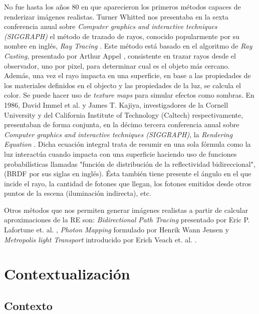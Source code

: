 \documentclass[titlepage,12pt]{report}
\begin{document}
No fue hasta los años 80 en que aparecieron los primeros métodos capaces de renderizar imágenes realistas. Turner Whitted nos presentaba en la sexta conferencia anual sobre \textit{Computer graphics and interactive techniques (SIGGRAPH)} el método de trazado de rayos, conocido popularmente por su nombre en inglés, \textit{Ray Tracing} \cite{Whitted1980}. Este método está basado en el algoritmo de \textit{Ray Casting}, presentado por Arthur Appel \cite{Appel1968}, consistente en trazar rayos desde el observador, uno por pixel, para determinar cual es el objeto más cercano. Además, una vez el rayo impacta en una superficie, en base a las propiedades de los materiales definidos en el objecto y las propiedades de la luz, se calcula el color. Se puede hacer uso de \textit{texture maps} para simular efectos como sombras. En 1986, David Immel et al. y James T. Kajiya, investigadores de la Cornell University y del California Institute of Technology (Caltech) respectivamente, presentaban de forma conjunta, en la décimo tercera conferencia anual sobre \textit{Computer graphics and interactive techniques (SIGGRAPH)}, la \textit{Rendering Equation} \citep{Kajiya1986, Immel1986}. Dicha ecuación integral trata de resumir en una sola fórmula como la luz interactúa cuando impacta con una superficie haciendo uso de funciones probabilísticas llamadas "función de distribución de la reflectividad bidireccional", (BRDF por sus siglas en inglés). Ésta también tiene presente el ángulo en el que incide el rayo, la cantidad de fotones que llegan, los fotones emitidos desde otros puntos de la escena (iluminación indirecta), etc.

Otros métodos que nos permiten generar imágenes realistas a partir de calcular aproximaciones de la RE son: \textit{Bidirectional Path Tracing} presentado por Eric P. Lafortune et. al. \cite{Lafortune1993}, \textit{Photon Mapping}  formulado por Henrik Wann Jensen \cite{Jensen1996} y \textit{Metropolis light Transport} introducido por Erich Veach et. al. \cite{Veach1997}.

\section{Contextualización}

\subsection{Contexto} \label{ref:contexto}
\end{document}
